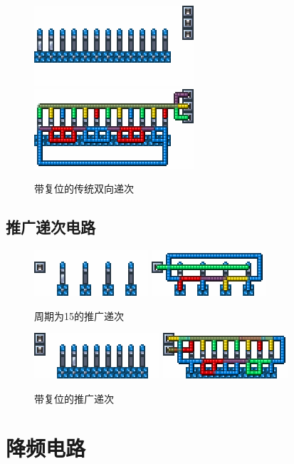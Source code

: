 \begin{figure}[!ht]
    \centering
    \includegraphics{images/265.png}
    \qquad
    \includegraphics{images/266.png}
    \caption{带复位的传统双向递次}
\end{figure}

\subsection{推广递次电路}
\mbox{}
\begin{figure}[!ht]
    \centering
    \includegraphics{images/84.png}
    \qquad
    \includegraphics{images/85.png}
    \caption{周期为15的推广递次}
\end{figure}
\begin{figure}[!ht]
    \centering
    \includegraphics{images/319.png}
    \qquad
    \includegraphics{images/320.png}
    \caption{带复位的推广递次}
\end{figure}

\section{降频电路}
